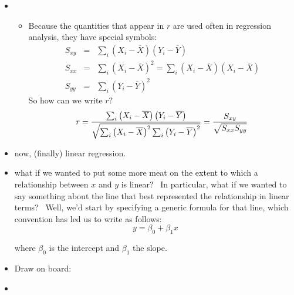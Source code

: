 \documentclass[11pt]{article}
\begin{document}
\begin{itemize}
\item 
\begin{itemize}
\item Because the quantities that appear in $r$ are used often in regression
analysis, they have special symbols: 
\begin{eqnarray*}
S_{xy} &=&\sum\nolimits_{i}\left( X_{i}-\overline{X}\right) \left( Y_{i}-%
\overline{Y}\right) \\
S_{xx} &=&\sum\nolimits_{i}\left( X_{i}-\overline{X}\right)
^{2}=\sum\nolimits_{i}\left( X_{i}-\overline{X}\right) \left( X_{i}-%
\overline{X}\right) \\
S_{yy} &=&\sum\nolimits_{i}\left( Y_{i}-\overline{Y}\right) ^{2}
\end{eqnarray*}%
So how can we write $r?$%
\begin{equation*}
r=\frac{\sum\nolimits_{i}\left( X_{i}-\overline{X}\right) \left( Y_{i}-%
\overline{Y}\right) }{\sqrt{\sum\nolimits_{i}\left( X_{i}-\overline{X}%
\right) ^{2}\sum\nolimits_{i}\left( Y_{i}-\overline{Y}\right) ^{2}}}=\frac{%
S_{xy}}{\sqrt{S_{xx}S_{yy}}}
\end{equation*}
\end{itemize}

\item now, (finally) linear regression.

\item what if we wanted to put some more meat on the extent to which a
relationship between $x$ and $y$ is linear? \ In particular, what if we
wanted to say something about the line that best represented the
relationship in linear terms? \ Well, we'd start by specifying a generic
formula for that line, which convention has led us to write as follows:%
\begin{equation*}
y=\beta _{0}+\beta _{1}x
\end{equation*}

where $\beta _{0}$ is the intercept and $\beta _{1}$ the slope.

\item Draw on board:

\item {}


\end{itemize}
\end{document}
